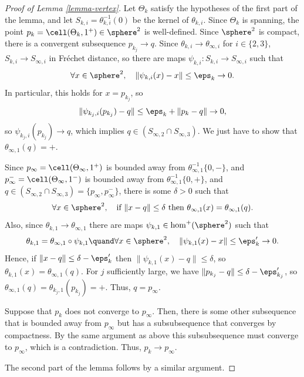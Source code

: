 \begin{proof}[Proof of Lemma \ref{lemma-vertex}]
Let $\Theta_k$ satisfy the hypotheses of the first part of the lemma, and let $S_{k,i} = \theta_{k,i}^{-1}(0)$ be the kernel of $\theta_{k,i}$.
Since $\Theta_k$ is spanning, the point $p_k = \cell(\Theta_k,1^+) \in \sphere^2$ is well-defined.
Since $\sphere^2$ is compact, there is a convergent subsequence $p_{k_j} \to q$.
Since $\theta_{k,i} \to \theta_{\infty,i}$ for $i \in \{2,3\}$, $S_{k,i} \to S_{\infty,i}$ in Fréchet distance, so there are maps $\psi_{k,i}:S_{k,i} \to S_{\infty,i}$ such that
\[
\forall x \in \sphere^2,\quad \|\psi_{k,i}(x)-x\| \leq \eps_k \to 0.
\]
In particular, this holds for $x=p_{k_j}$, so
\[
\| \psi_{k_j,i}(p_{k_j}) -q\| \leq \eps_k + \|p_k -q\| \to 0,
\]
so $\psi_{k_j,i}(p_{k_j}) \to q$, which implies $q \in (S_{\infty,2} \cap S_{\infty,3})$.
We just have to show that $\theta_{\infty,1}(q)=+$.

Since $p_\infty = \cell(\Theta_\infty,1^+)$ is bounded away from $\theta_{\infty,1}^{-1}\{0,-\}$, and $p^-_\infty = \cell(\Theta_\infty,1^-)$ is bounded away from $\theta_{\infty,1}^{-1}\{0,+\}$, and $q \in (S_{\infty,2} \cap S_{\infty,3}) = \{p_\infty,p^-_\infty\}$, there is some $\delta > 0$ such that
\[
\forall x \in \sphere^2,\quad\text{if }\|x-q\| \leq \delta\text{ then }\theta_{\infty,1}(x) = \theta_{\infty,1}(q).
\]
Also, since $\theta_{k,1} \to \theta_{\infty,1}$ there are maps $\psi_{k,1} \in \hom^+(\sphere^2)$ such that
\[
\theta_{k,1} = \theta_{\infty,1} \circ \psi_{k,1}\quand\forall x \in \sphere^2,\quad \|\psi_{k,1}(x) -x\| \leq \eps'_k \to 0.
\]
Hence, if $\|x-q\| \leq \delta -\eps'_k$ then $\|\psi_{k,1}(x)-q\| \leq \delta$, so $\theta_{k,1}(x) = \theta_{\infty,1}(q)$.
For $j$ sufficiently large, we have $\|p_{k_j} -q\| \leq \delta -\eps'_{k_j}$, so $\theta_{\infty,1}(q) = \theta_{k_j,1}(p_{k_j}) = +$. Thus, $q = p_\infty$.

Suppose that $p_k$ does not converge to $p_\infty$. Then, there is some other subsequence that is bounded away from $p_\infty$ but has a subsubsequence that converges by compactness. By the same argument as above this subsubsequence must converge to $p_\infty$, which is a contradiction. Thus, $p_k \to p_\infty$.

The second part of the lemma follows by a similar argument.
\end{proof}

